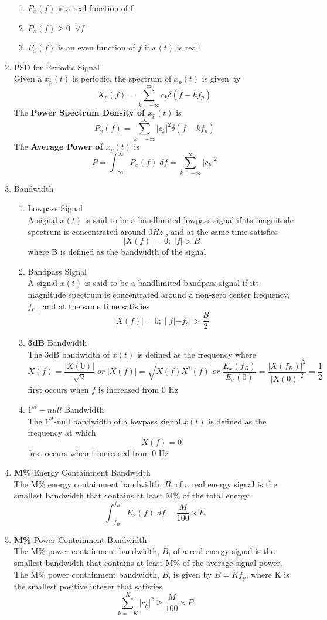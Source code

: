 \begin{enumerate}
        \begin{enumerate}
            \item $P_x(f)$ is a real function of f
            \item $P_x(f) \geq 0 \;\; \forall f$
            \item $P_x(f)$ is an even function of $f$ if $x(t)$ is real
        \end{enumerate}
    \item PSD for Periodic Signal\\
    Given a $x_p(t)$ is periodic, the spectrum of $x_p(t)$ is given by
    \[X_p(f) = \sum^{\infty}_{k=-\infty}c_k\delta(f-kf_p)\]
    The \textbf{Power Spectrum Density of $x_p(t)$} is
    \[P_x(f) = \sum^{\infty}_{k=-\infty}|c_k|^2\delta(f-kf_p) \]
    The \textbf{Average Power of $x_p(t)$} is 
    \[P = \int^{\infty}_{-\infty}P_x(f)\;df = \sum^{\infty}_{k=-\infty}|c_k|^2\]
    \item Bandwidth
    \begin{enumerate}
        \item Lowpass Signal\\
        A signal $x(t)$ is said to be a bandlimited lowpass signal if its magnitude spectrum is concentrated around $0 Hz$ , and at the same time satisfies
        \[|X(f)| = 0 ; \; |f| > B\]
        where B is defined as the bandwidth of the signal
        \item Bandpass Signal \\
        A signal $x(t)$ is said to be a bandlimited bandpass signal if its magnitude spectrum is concentrated around a non-zero center frequency, $f_c$ , and at the same time satisfies
        \[|X(f)| = 0 ; \; ||f| -f_c|> \frac{B}{2}\]
        \item \textbf{3dB} Bandwidth \\
        The 3dB bandwidth of $x(t)$ is defined as the frequency where 
        \[X(f) = \frac{|X(0)|}{\sqrt{2}}\; or \; |X(f)| = \sqrt{X(f)X^*(f)} \; or \; \frac{E_x(f_B)}{E_x(0)} = \frac{|X(f_B)|^2}{|X(0)|^2} = \frac{1}{2}\]
        first occurs when $f$ is increased from 0 Hz
        \item \textbf{$1^{st}-null$} Bandwidth \\
        The $1^{st}$-null bandwidth of a lowpass signal $x(t)$ is defined as the frequency at which 
        \[X(f) = 0\]
        first occurs when f increased from 0 Hz
    \end{enumerate}
    \item \textbf{M\%} Energy Containment Bandwidth \\
    The M\% energy containment bandwidth, $B$, of a real energy signal is the smallest bandwidth that contains at least M\% of the total energy 
    \[\int^{f_B}_{-f_B}E_x(f)\;df = \frac{M}{100}\times E\]
    \item \textbf{M\%} Power Containment Bandwidth \\
    The M\% power containment bandwidth, $B$, of a real energy signal is the smallest bandwidth that contains at least M\% of the average signal power. The M\% power containment bandwidth, $B$, is given by $B = Kf_p$, where K is the smallest positive integer that satisfies 
    \[\sum^{K}_{k=-K}|c_k|^2\geq\frac{M}{100}\times P\]
\end{enumerate}
\newpage
